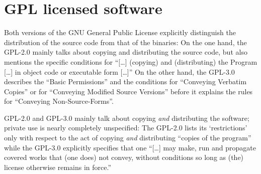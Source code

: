%
%
%
%
%



\section{GPL licensed software}

Both versions of the GNU General Public License explicitly distinguish the
distribution of the source code from that of the binaries: On the one hand, the
GPL-2.0 mainly talks about copying and distributing the source
code, but also mentions the specific conditions for
\enquote{[\ldots] (copying) and (distributing) the Program [\ldots] in object
code or executable form [\ldots]} On the other hand, the GPL-3.0
describes the \enquote{Basic Permissions} and the conditions for
\enquote{Conveying Verbatim Copies} or for \enquote{Conveying Modified Source
Versions} before it explains the rules for
\enquote{Conveying Non-Source-Forms}.  

GPL-2.0 and GPL-3.0 mainly talk about copying \emph{and} distributing the
software; private use is nearly completely unspecified: The GPL-2.0 lists its
`restrictions' only with respect to the act of copying \emph{and} distributing
\enquote{copies of the program} while the GPL-3.0 explicitly specifies that one \enquote{[\ldots] may
make, run and propagate covered works that (one does) not convey, without
conditions so long as (the) license otherwise remains in
force.} 

